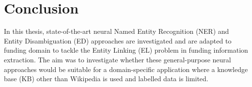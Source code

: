 \documentclass{report}
\theoremstyle{definition}
\theoremstyle{remark}
\begin{document}



\chapter{Conclusion}
\label{chapter:Conclusion}
In this thesis, state-of-the-art neural Named Entity Recognition (NER) and Entity Disambiguation (ED) approaches are investigated and are adapted to funding domain to tackle the Entity Linking (EL) problem in funding information extraction. The aim was to investigate whether these general-purpose neural approaches would be suitable for a domain-specific application where a knowledge base (KB) other than Wikipedia is used and labelled data is limited.
\end{document}
